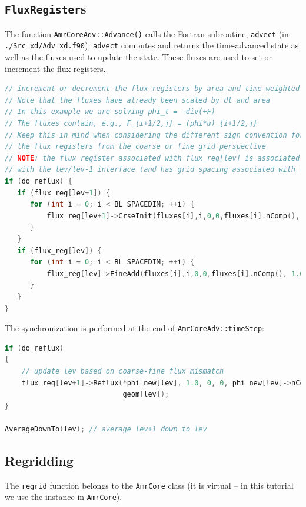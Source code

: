 \subsection{{\tt FluxRegister}s}
The function {\tt AmrCoreAdv::Advance()} calls the Fortran
subroutine, {\tt advect} (in {\tt ./Src\_xd/Adv\_xd.f90}).  {\tt advect} computes
and returns the time-advanced state as well as the fluxes used to update the state.
These fluxes are used to set or increment the flux registers.
\begin{lstlisting}[language=cpp]
// increment or decrement the flux registers by area and time-weighted fluxes
// Note that the fluxes have already been scaled by dt and area
// In this example we are solving phi_t = -div(+F)
// The fluxes contain, e.g., F_{i+1/2,j} = (phi*u)_{i+1/2,j}
// Keep this in mind when considering the different sign convention for updating
// the flux registers from the coarse or fine grid perspective
// NOTE: the flux register associated with flux_reg[lev] is associated
// with the lev/lev-1 interface (and has grid spacing associated with lev-1)
if (do_reflux) { 
   if (flux_reg[lev+1]) {
      for (int i = 0; i < BL_SPACEDIM; ++i) {
          flux_reg[lev+1]->CrseInit(fluxes[i],i,0,0,fluxes[i].nComp(), -1.0);
      }	    
   }
   if (flux_reg[lev]) {
      for (int i = 0; i < BL_SPACEDIM; ++i) {
          flux_reg[lev]->FineAdd(fluxes[i],i,0,0,fluxes[i].nComp(), 1.0);
      }
   }
}
\end{lstlisting}
The synchronization is performed at the end of {\tt AmrCoreAdv::timeStep}:
\begin{lstlisting}[language=cpp]
if (do_reflux)
{
    // update lev based on coarse-fine flux mismatch
    flux_reg[lev+1]->Reflux(*phi_new[lev], 1.0, 0, 0, phi_new[lev]->nComp(),
                            geom[lev]);
}

AverageDownTo(lev); // average lev+1 down to lev
\end{lstlisting}

\subsection{Regridding \label{ss:regridding}}
The {\tt regrid} function belongs to the {\tt AmrCore} class (it is virtual -- in this
tutorial we use the instance in {\tt AmrCore}).

